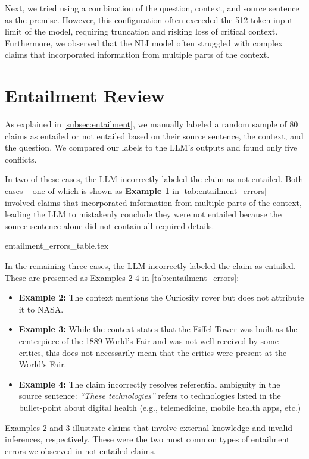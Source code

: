 Next, we tried using a combination of the question, context, and source sentence as the premise. However, this configuration often exceeded the 512-token input limit of the model, requiring truncation and risking loss of critical context. Furthermore, we observed that the NLI model often struggled with complex claims that incorporated information from multiple parts of the context.

\section{Entailment Review}
\label{app:entailment_review}

As explained in \autoref{subsec:entailment}, we manually labeled a random sample of 80 claims as entailed or not entailed based on their source sentence, the context, and the question. We compared our labels to the LLM’s outputs and found only five conflicts.

In two of these cases, the LLM incorrectly labeled the claim as not entailed. Both cases – one of which is shown as \textbf{Example 1} in \autoref{tab:entailment_errors} – involved claims that incorporated information from multiple parts of the context, leading the LLM to mistakenly conclude they were not entailed because the source sentence alone did not contain all required details.

{entailment_errors_table.tex}

In the remaining three cases, the LLM incorrectly labeled the claim as entailed. These are presented as Examples 2-4 in \autoref{tab:entailment_errors}: 
\begin{itemize}
    \item \textbf{Example 2:} The context mentions the Curiosity rover but does not attribute it to NASA. 
    \item \textbf{Example 3:} While the context states that the Eiffel Tower was built as the centerpiece of the 1889 World’s Fair and was not well received by some critics, this does not necessarily mean that the critics were present at the World’s Fair. 
    \item \textbf{Example 4:} The claim incorrectly resolves referential ambiguity in the source sentence: \textit{``These technologies''} refers to technologies listed in the bullet-point about digital health (e.g., telemedicine, mobile health apps, etc.)
\end{itemize}

Examples 2 and 3 illustrate claims that involve external knowledge and invalid inferences, respectively. These were the two most common types of entailment errors we observed in not-entailed claims.

